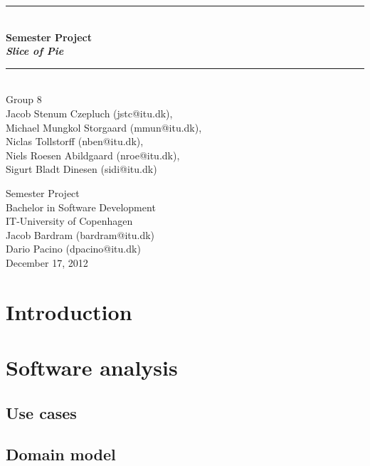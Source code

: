 \documentclass[a4paper,11pt]{article}
\begin{document}
\begin{titlepage}
\centering \parindent=0pt
\newcommand{\HRule}{\rule{\textwidth}{1mm}}
 \HRule\\[1cm]\Huge\bfseries
Semester Project\\\emph{Slice of Pie}\\[0.7cm]
\HRule\\[4cm]  \large Group 8
\\Jacob Stenum Czepluch (jstc@itu.dk), 
\\Michael Mungkol Storgaard (mmun@itu.dk),
\\Niclas Tollstorff (nben@itu.dk), 
\\Niels Roesen Abildgaard (nroe@itu.dk), 
\\Sigurt Bladt Dinesen (sidi@itu.dk) \\

 \normalsize %
\begin{flushleft}
Semester Project\\
Bachelor in Software Development\\
IT-University of Copenhagen\\
Jacob Bardram (bardram@itu.dk)\\
Dario Pacino (dpacino@itu.dk) \\
December 17, 2012 \end{flushleft}
\end{titlepage}

\tableofcontents
\pagebreak

\pagebreak
\section{Introduction}


\pagebreak

\pagebreak
\section{Software analysis}


\subsection{Use cases}


\subsection{Domain model}

\end{document}
